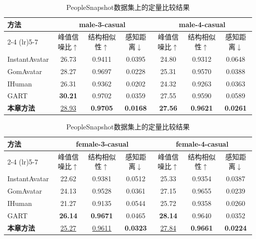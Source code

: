 \begin{table}[htbp]
    \centering\small
    \caption{PeopleSnapshot数据集上的定量比较结果}
    \label{tab:people}
    \setlength{\tabcolsep}{1pt}
    \renewcommand{\arraystretch}{1.1}

    \begin{tabular}{l ccc ccc}
        \toprule
        \multirow{2}{*}{\textbf{方法}} &
        \multicolumn{3}{c}{\textbf{male-3-casual}} &
        \multicolumn{3}{c}{\textbf{male-4-casual}} \\
        \cmidrule(lr){2-4} \cmidrule(lr){5-7}
        & 峰值信噪比$\uparrow$ & 结构相似性$\uparrow$ & 感知距离$\downarrow$
        & 峰值信噪比$\uparrow$ & 结构相似性$\uparrow$ & 感知距离$\downarrow$ \\
        \midrule
        InstantAvatar
        & 26.73 & 0.9411 & 0.0395
        & 24.80 & 0.9312 & 0.0648 \\
        GomAvatar
        & 28.27 & 0.9697 & 0.0228
        & 25.31 & 0.9570 & 0.0388 \\
        IHuman
        & 26.31 & 0.9362 & 0.0202
        & 24.32 & 0.9263 & 0.0363 \\
        GART
        & \textbf{30.21} & 0.9702 & 0.0359
        & 27.55 & 0.9590 & 0.0589 \\
        \midrule
        \textbf{本章方法}
        & \underline{28.93} & \textbf{0.9705} & \textbf{0.0168}
        & \textbf{27.56} & \textbf{0.9621} & \textbf{0.0261} \\
        \bottomrule
    \end{tabular}

    \vspace{0.6em}

    \begin{tabular}{l ccc ccc}
        \toprule
        \multirow{2}{*}{\textbf{方法}} &
        \multicolumn{3}{c}{\textbf{female-3-casual}} &
        \multicolumn{3}{c}{\textbf{female-4-casual}} \\
        \cmidrule(lr){2-4} \cmidrule(lr){5-7}
        & 峰值信噪比$\uparrow$ & 结构相似性$\uparrow$ & 感知距离$\downarrow$
        & 峰值信噪比$\uparrow$ & 结构相似性$\uparrow$ & 感知距离$\downarrow$ \\
        \midrule
        InstantAvatar
        & 22.62 & 0.9381 & 0.0512
        & 25.33 & 0.9354 & 0.0387 \\
        GomAvatar
        & 24.13 & 0.9528 & 0.0361
        & 27.15 & 0.9655 & 0.0239 \\
        IHuman
        & 21.27 & 0.9135 & 0.0544
        & 25.72 & 0.9358 & 0.0260 \\
        GART
        & \textbf{26.14} & \textbf{0.9671} & 0.0465
        & \textbf{28.14} & 0.9640 & 0.0352 \\
        \midrule
        \textbf{本章方法}
        & \underline{25.27} & \underline{0.9611} & \textbf{0.0323}
        & \underline{27.84} & \textbf{0.9661} & \textbf{0.0224} \\
        \bottomrule
    \end{tabular}
\end{table}
